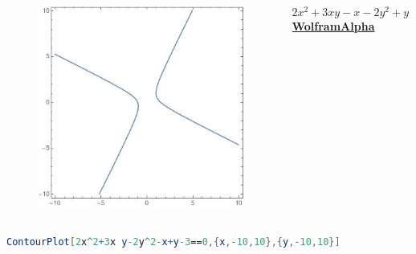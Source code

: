 \documentclass[10pt]{beamer}
\begin{document}
    \begin{frame}[fragile]
        \begin{columns}
            \begin{column}{0.5\textwidth}
                \begin{figure}
                    \includegraphics[width=\textwidth]{hyperbola.jpg}
                \end{figure}
            \end{column}

            \begin{column}{0.4\textwidth}
                \begin{equation*}
                    2 x^2+3 x y-x-2 y^2+y-3 = 0
                \end{equation*}
                \href{https://www.wolframalpha.com/}{\textbf{WolframAlpha}}
            \end{column}
        \end{columns}
        \begin{lstlisting}[language=Mathematica]
            ContourPlot[2x^2+3x y-2y^2-x+y-3==0,{x,-10,10},{y,-10,10}]
        \end{lstlisting}
    \end{frame}
\end{document}
